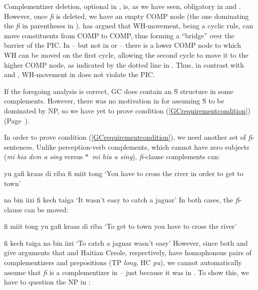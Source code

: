 Complementizer deletion, optional in , is, as we have seen, obliga\-tory in  and . However, once \textit{fi} is deleted, we have an empty COMP node (the one dominating the \textit{fi} in parentheses in ). \citet{Chomsky1977} has argued that WH-movement, being a cyclic rule, can move constituents from COMP to COMP, thus forming a ``bridge'' over the barrier of the PIC. In  -- but not in  or  -- there is a lower COMP node to which WH can be moved on the first cycle, allowing the second cycle to move it to the higher COMP node, as indicated by the dotted line in . Thus, in contrast with  and , WH-movement in  does not violate the PIC.

If the foregoing analysis is correct, GC does contain an \=S structure in some complements. However, there was no motivation in  for assuming \=S to be dominated by NP, so we have yet to prove condi\-tion (\ref{GCrequirementcondition}) (Page~\pageref{GCrequirementcondition}).

In order to prove condition (\ref{GCrequirementcondition}), we need another set of \textit{fi}-sentences. Unlike perception-verb complements, which cannot have zero subjects (\textit{mi hia dem a sing} versus *~\textit{mi hia a sing}), \textit{fi}-clause complements can:

\ea\label{ex:2:202}
yu gafi kraas di riba fi miit tong
\glt `You have to cross the river in order to get to town'
\z


\ea\label{ex:2:203}
na bin iizi fi kech taiga
\glt `It wasn't easy to catch a jaguar'
\z
In both cases, the \textit{fi}-clause can be moved:

\ea\label{ex:2:204}
 fi miit tong yu gafi kraas di riba
\glt `To get to town you have to cross the river'
\z

\ea\label{ex:2:205}
fi kech taiga na bin iizi
\glt `To catch a jaguar wasn't easy'
\z
However, since both \citet{Woolford1979} and \citet{KoopmanEtAl1981} give arguments that  and Haitian Creole, respectively, have homophonous pairs of complementizers and prepositions (TP \textit{long}, HC \textit{pu}), we cannot automatically assume that \textit{fi} is a complementizer in -- just because it was in . To show this, we have to question the NP in :

